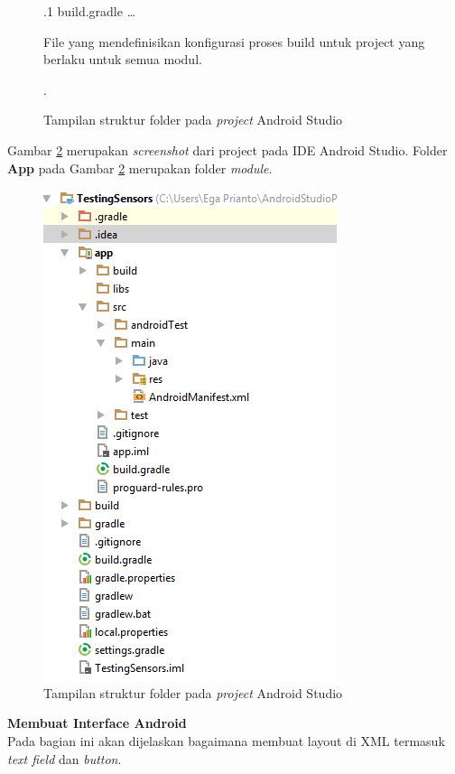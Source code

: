 \documentclass[a4paper,twoside]{article}
\begin{document}
\begin{enumerate}
\begin{figure}[htbp]
{.1 {build.gradle} \ldots{} \begin{minipage}[t]{5cm}File yang mendefinisikan konfigurasi proses build untuk project yang berlaku untuk semua modul{.}\end{minipage}.
}
				\caption{Tampilan struktur folder pada \textit{project} Android Studio}
				\label{fig:android-studio-structure}
				\end{figure}
				Gambar \ref{fig:android-studio-structure-screenshot} merupakan \textit{screenshot} dari project pada IDE Android Studio.
				Folder \textbf{App} pada Gambar \ref{fig:android-studio-structure-screenshot} merupakan folder \textit{module}.
				
				\begin{figure}[htbp]
					\centering
						\includegraphics[scale=1]{Gambar/android-studio-structure.png}
					\caption{Tampilan struktur folder pada \textit{project} Android Studio}
					\label{fig:android-studio-structure-screenshot}
				\end{figure}

				\textbf{Membuat Interface Android}\\
				
\cite{android_developers}
Pada bagian ini akan dijelaskan bagaimana membuat layout di XML termasuk \textit{text field} dan \textit{button}.\\


\end{enumerate}
\end{document}

